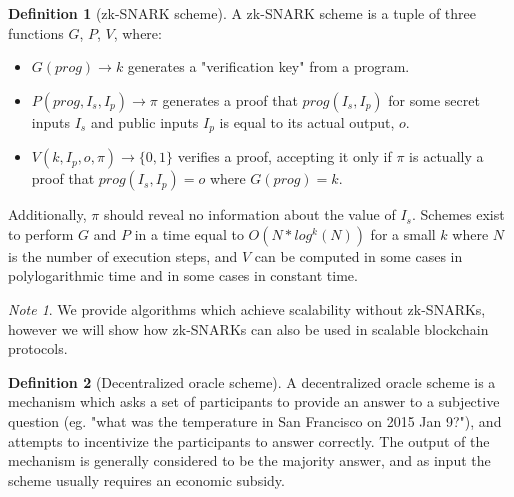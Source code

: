 \documentclass[11pt,a4paper]{report}
\theoremstyle{plain}
\theoremstyle{definition}
\newtheorem{defn}{Definition}[chapter]
\theoremstyle{remark}
\newtheorem*{note}{Note}
\begin{document}
\begin{defn}[zk-SNARK scheme]
A zk-SNARK scheme is a tuple of three functions $G$, $P$, $V$, where:
\begin{itemize}
\item
$G(prog) \rightarrow k$ generates a "verification key" from a program.
\item
$P(prog, I_s, I_p) \rightarrow \pi$ generates a proof that $prog(I_s, I_p)$ for some secret inputs $I_s$ and public inputs $I_p$ is equal to its actual output, $o$.
\item
$V(k, I_p, o, \pi) \rightarrow \{0, 1\}$ verifies a proof, accepting it only if $\pi$ is actually a proof that $prog(I_s, I_p) = o$ where $G(prog) = k$.
\end{itemize}
Additionally, $\pi$ should reveal no information about the value of $I_s$. Schemes exist \citep{ben-sasson_succinct_2014} to perform $G$ and $P$ in a time equal to $O(N*log^k(N))$ for a small $k$ where $N$ is the number of execution steps, and $V$ can be computed in some cases in polylogarithmic time and in some cases in constant time.
\end{defn}

\begin{note}
We provide algorithms which achieve scalability without zk-SNARKs, however we will show how zk-SNARKs can also be used in scalable blockchain protocols.
\end{note}

\begin{defn}[Decentralized oracle scheme]
A decentralized oracle scheme is a mechanism which asks a set of participants to provide an answer to a subjective question (eg. "what was the temperature in San Francisco on 2015 Jan 9?"), and attempts to incentivize the participants to answer correctly. The output of the mechanism is generally considered to be the majority answer, and as input the scheme usually requires an economic subsidy.
\end{defn}
\end{document}
